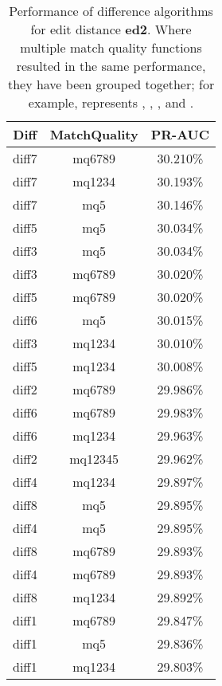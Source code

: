 \begin{table}[tbph]
\begin{center}
\begin{tabular}{|c|c||c|}
\hline
Diff & MatchQuality & PR-AUC  \\
\hline
\hline
diff7 & mq6789 & 30.210\% \\
diff7 & mq1234 & 30.193\% \\
diff7 & mq5 & 30.146\% \\
diff5 & mq5 & 30.034\% \\
diff3 & mq5 & 30.034\% \\
diff3 & mq6789 & 30.020\% \\
diff5 & mq6789 & 30.020\% \\
diff6 & mq5 & 30.015\% \\
diff3 & mq1234 & 30.010\% \\
diff5 & mq1234 & 30.008\% \\
diff2 & mq6789 & 29.986\% \\
diff6 & mq6789 & 29.983\% \\
diff6 & mq1234 & 29.963\% \\
diff2 & mq12345 & 29.962\% \\
diff4 & mq1234 & 29.897\% \\
diff8 & mq5 & 29.895\% \\
diff4 & mq5 & 29.895\% \\
diff8 & mq6789 & 29.893\% \\
diff4 & mq6789 & 29.893\% \\
diff8 & mq1234 & 29.892\% \\
diff1 & mq6789 & 29.847\% \\
diff1 & mq5 & 29.836\% \\
diff1 & mq1234 & 29.803\% \\
\hline
\end{tabular}
\end{center}
\caption[Comparison of diff algorithms using edit distance \textbf{ed2}]{
  Performance of difference algorithms for
  edit distance \textbf{ed2}.  Where multiple match
  quality functions resulted in the same performance, they
  have been grouped together; for example,  represents
  , , , and .}
\label{tab:editlongbyed2}
\end{table}
